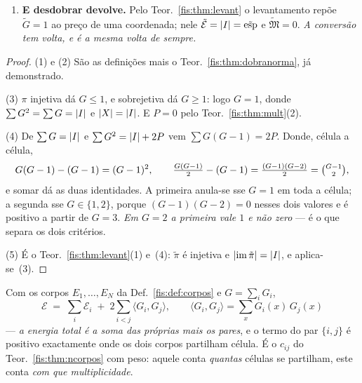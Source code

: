 \documentclass[livro.tex]{subfiles}
\begin{document}
\begin{teorema}
\begin{enumerate}
\emph{exactamente}:
\[
\boxed{\;2P-\mathfrak{M}=\sum_x\bigl(G(x)-1\bigr)^{2},
\qquad
P-\mathfrak{M}=\sum_x\binom{G(x)-1}{2}\;}
\]
--- donde $2P\ge\mathfrak{M}$ com igualdade só no caso plano ($G=1$, e aí
ambos são nulos), ao passo que $P\ge\mathfrak{M}$ tem igualdade quando
\textbf{nenhuma célula tem mais do que dois índices}. \emph{São dois critérios e
não um, e o factor $2$ decide qual.}
\item[(5)] \textbf{E desdobrar devolve.} Pelo Teor.~\ref{fis:thm:levant} o
levantamento repõe $\tilde G=1$ ao preço de uma coordenada; nele
$\tilde{\mathcal{E}}=\lvert I\rvert=\tilde{\operatorname{esp}}$ e
$\tilde{\mathfrak{M}}=0$. \emph{A conversão tem volta, e é a mesma volta de
sempre.}
\end{enumerate}
\end{teorema}

\begin{proof}
(1) e (2) São as definições mais o Teor.~\ref{fis:thm:dobranorma}, já
demonstrado.

(3) $\pi$ injetiva dá $G\le1$, e sobrejetiva dá $G\ge1$: logo $G=1$, donde
$\sum G^{2}=\sum G=\lvert I\rvert$ e $\lvert X\rvert=\lvert I\rvert$. E $P=0$ pelo
Teor.~\ref{fis:thm:mult}(2).

(4) De $\sum G=\lvert I\rvert$ e $\sum G^{2}=\lvert I\rvert+2P$ vem $\sum G(G-1)=2P$. Donde,
célula a célula,
\[
G(G-1)-(G-1)=(G-1)^{2},\qquad
\tfrac{G(G-1)}{2}-(G-1)=\tfrac{(G-1)(G-2)}{2}=\tbinom{G-1}{2},
\]
e somar dá as duas identidades. A primeira anula-se sse $G=1$ em toda a célula; a
segunda sse $G\in\{1,2\}$, porque $(G-1)(G-2)=0$ nesses dois valores e é positivo
a partir de $G=3$. \emph{Em $G=2$ a primeira vale $1$ e não zero} --- é o que
separa os dois critérios.

(5) É o Teor.~\ref{fis:thm:levant}(1) e~(4): $\tilde\pi$ é injetiva e
$\lvert \operatorname{im}\tilde\pi\rvert=\lvert I\rvert$, e aplica-se~(3).
\end{proof}

\begin{corolario}\label{fis:cor:cruzado}
Com os corpos $E_1,\dots,E_N$ da Def.~\ref{fis:def:corpos} e $G=\sum_i G_i$,
\[
\boxed{\;\mathcal{E}\;=\;\sum_i\mathcal{E}_i\;+\;2\sum_{i<j}\bigl\langle G_i,G_j\bigr\rangle,
\qquad \bigl\langle G_i,G_j\bigr\rangle=\sum_x G_i(x)\,G_j(x)\;}
\]
--- \emph{a energia total é a soma das próprias mais os pares}, e o termo do par
$\{i,j\}$ é positivo exactamente onde os dois corpos partilham célula. É o
$c_{ij}$ do Teor.~\ref{fis:thm:ncorpos} com peso: aquele conta \emph{quantas}
células se partilham, este conta \emph{com que multiplicidade}.
\end{corolario}
\end{document}
